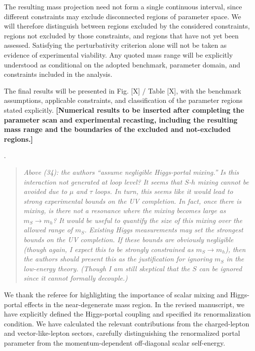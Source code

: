 \documentclass[12pt,a4paper]{article}
\begin{document}
The resulting mass projection need not form a single continuous interval, since different constraints may exclude disconnected regions of parameter space. We will therefore distinguish between regions excluded by the considered constraints, regions not excluded by those constraints, and regions that have not yet been assessed. Satisfying the perturbativity criterion alone will not be taken as evidence of experimental viability. Any quoted mass range will be explicitly understood as conditional on the adopted benchmark, parameter domain, and constraints included in the analysis.

The final results will be presented in Fig. [X] / Table [X], with the benchmark assumptions, applicable constraints, and classification of the parameter regions stated explicitly. \textbf{[Numerical results to be inserted after completing the parameter scan and experimental recasting, including the resulting mass range and the boundaries of the excluded and not-excluded regions.]}

\medskip
{}. \begin{quote}\itshape
Above (34): the authors ``assume negligible Higgs-portal mixing.'' Is this interaction not generated at loop level? It seems that \(S\)-\(h\) mixing cannot be avoided due to \(\mu\) and \(\tau\) loops. In turn, this seems like it would lead to strong experimental bounds on the UV completion. In fact, once there is mixing, is there not a resonance where the mixing becomes large as \(m_S\to m_h\)? It would be useful to quantify the size of this mixing over the allowed range of \(m_S\). Existing Higgs measurements may set the strongest bounds on the UV completion. If these bounds are obviously negligible (though again, I expect this to be strongly constrained as \(m_S\to m_h\)), then the authors should present this as the justification for ignoring \(m_S\) in the low-energy theory. (Though I am still skeptical that the \(S\) can be ignored since it cannot formally decouple.)\end{quote}

We thank the referee for highlighting the importance of scalar mixing and Higgs-portal effects in the near-degenerate mass region. In the revised manuscript, we have explicitly defined the Higgs-portal coupling and specified its renormalization condition. We have calculated the relevant contributions from the charged-lepton and vector-like-lepton sectors, carefully distinguishing the renormalized portal parameter from the momentum-dependent off-diagonal scalar self-energy.
\end{document}
